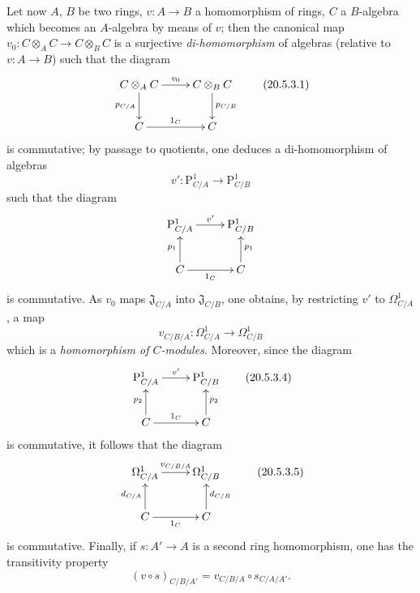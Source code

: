 \begin{env}[20.5.3]
\label{0.20.5.3}
Let now $A$, $B$ be two rings, $v:A\to B$ a homomorphism of rings, $C$ a $B$-algebra which becomes an $A$-algebra by means of $v$; then the canonical map $v_0:C\otimes_A C\to C\otimes_B C$ is a surjective \emph{di-homomorphism} of algebras (relative to $v:A\to B$) such that the diagram
\[
\xymatrix{
  C\otimes_A C \ar[r]^{v_0} \ar[d]_{p_{C/A}} & C\otimes_B C \ar[d]^{p_{C/B}} \\
  C \ar[r]^{1_C} & C
}
\tag{20.5.3.1}
  \label{0.20.5.3.1}
\]
is commutative; by passage to quotients, one deduces a di-homomorphism of algebras
\begin{equation}
\tag{20.5.3.2}
  \label{0.20.5.3.2}
  v':\mathrm{P}^1_{C/A}\to\mathrm{P}^1_{C/B}
\end{equation}
such that the diagram
\[
\xymatrix{
  \mathrm{P}^1_{C/A} \ar[r]^{v'} & \mathrm{P}^1_{C/B} \\
  C \ar[u]^{p_1} \ar[r]_{1_C} & C \ar[u]_{p_1}
}
\]
is commutative.
As $v_0$ maps $\mathfrak{J}_{C/A}$ into $\mathfrak{J}_{C/B}$, one obtains, by restricting $v'$ to $\Omega^1_{C/A}$, a map
\begin{equation}
\tag{20.5.3.3}
  \label{0.20.5.3.3}
  v_{C/B/A}:\Omega^1_{C/A}\to\Omega^1_{C/B}
\end{equation}
which is a \emph{homomorphism of $C$-modules}.
Moreover, since the diagram
\begin{equation}
\label{0.20.5.3.4}
\xymatrix{
  \mathrm{P}^1_{C/A} \ar[r]^{v'} & \mathrm{P}^1_{C/B} \\
  C \ar[u]^{p_2} \ar[r]^{1_C} & C \ar[u]_{p_2}
}
\tag{20.5.3.4}
\end{equation}
is commutative, it follows that the diagram
\[
\xymatrix{
  \Omega^1_{C/A} \ar[r]^{v_{C/B/A}} & \Omega^1_{C/B} \\
  C \ar[u]^{d_{C/A}} \ar[r]_{1_C} & C \ar[u]_{d_{C/B}}
}
\tag{20.5.3.5}
  \label{0.20.5.3.5}
\]
is commutative.
Finally, if $s:A'\to A$ is a second ring homomorphism, one has the transitivity property
\begin{equation}
\tag{20.5.3.6}
  \label{0.20.5.3.6}
  (v\circ s)_{C/B/A'} = v_{C/B/A}\circ s_{C/A/A'}.
\end{equation}
\end{env}

